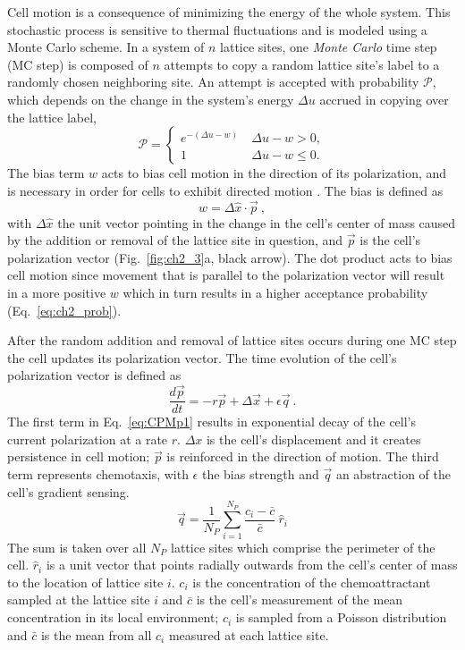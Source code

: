 Cell motion is a consequence of minimizing the energy of the whole system. This stochastic process is sensitive to thermal fluctuations and is modeled using a Monte Carlo scheme. In a system of $n$ lattice sites, one \textit{Monte Carlo} time step (MC step) is composed of $n$ attempts to copy a random lattice site's label to a randomly chosen neighboring site. An attempt is accepted with probability $\mathcal{P}$, which depends on the change in the system's energy $\Delta u$ accrued in copying over the lattice label,
\begin{equation} \label{eq:ch2_prob}
    \mathcal{P} =
    \begin{cases}
        e^{-\left( \Delta u - w \right)} &\ \Delta u - w > 0 , \\
        1 &\ \Delta u - w \leq 0 .
    \end{cases}
\end{equation}
The bias term $w$ acts to bias cell motion in the direction of its polarization, and is necessary in order for cells to exhibit directed motion \cite{szabo2010collective}.
The bias is defined as
\begin{equation}
    w = \Delta\hat{x} \cdot \vec{p} \ ,
\end{equation}
with $\Delta\hat{x}$ the unit vector pointing in the change in the cell's center of mass caused by the addition or removal of the lattice site in question, and $\vec{p}$ is the cell's polarization vector (Fig.\ \ref{fig:ch2_3}a, black arrow). The dot product acts to bias cell motion since movement that is parallel to the polarization vector will result in a more positive $w$ which in turn results in a higher acceptance probability (Eq.\ \ref{eq:ch2_prob}).

After the random addition and removal of lattice sites occurs during one MC step the cell updates its polarization vector. The time evolution of the cell's polarization vector is defined as
\begin{equation} \label{eq:CPMp1}
    \frac{d\vec{p}}{dt} = -r\vec{p} + \Delta\vec{x} + \epsilon \vec{q}\ .
\end{equation}
The first term in Eq.\ \ref{eq:CPMp1} results in exponential decay of the cell's current polarization at a rate $r$. $\Delta x$ is the cell's displacement and it creates persistence in cell motion; $\vec{p}$ is reinforced in the direction of motion. The third term represents chemotaxis, with $\epsilon$ the bias strength and $\vec{q}$ an abstraction of the cell's gradient sensing.
\begin{equation} \label{eq:CPMq1}
    \vec{q} = \frac{1}{N_P} \sum_{i=1}^{N_P} \frac{c_i-\bar{c}}{\bar{c}} \ \hat{r}_i
\end{equation}
The sum is taken over all $N_P$ lattice sites which comprise the perimeter of the cell. $\hat{r}_i$ is a unit vector that points radially outwards from the cell's center of mass to the location of lattice site $i$. $c_i$ is the concentration of the chemoattractant sampled at the lattice site $i$ and $\bar{c}$ is the cell's measurement of the mean concentration in its local environment; $c_i$ is sampled from a Poisson distribution and $\bar{c}$ is the mean from all $c_i$ measured at each lattice site.

